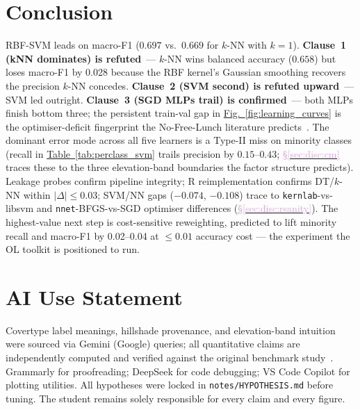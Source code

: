\documentclass[conference]{IEEEtran}
\newcommand{\figref}[1]{\hyperref[#1]{\textcolor{denim_comp}{Fig.~\ref*{#1}}}}
\newcommand{\tabref}[1]{\hyperref[#1]{\textcolor{sage}{Table~\ref*{#1}}}}
\newcommand{\secref}[1]{\hyperref[#1]{\textcolor{plum}{\S\ref*{#1}}}}
\begin{document}
\section{Conclusion}\label{sec:conclusion}
RBF-SVM leads on macro-F1 ($0.697$ vs.\ $0.669$ for $k$-NN with $k{=}1$).
\textbf{Clause~1 (kNN dominates) is refuted}~--- $k$-NN wins balanced
accuracy ($0.658$) but loses macro-F1 by 0.028 because the RBF kernel's
Gaussian smoothing recovers the precision $k$-NN concedes.
\textbf{Clause~2 (SVM second) is refuted upward}~--- SVM led outright.
\textbf{Clause~3 (SGD MLPs trail) is confirmed}~--- both MLPs finish bottom
three; the persistent train-val gap in \figref{fig:learning_curves}
is the optimiser-deficit fingerprint the No-Free-Lunch literature
predicts~\cite{wolpert1996nfl}.
The dominant error mode across all five learners is a Type-II miss on
minority classes (recall in \tabref{tab:perclass_svm} trails precision by
$0.15$--$0.43$; \secref{sec:disc:cm} traces these to the three elevation-band
boundaries the factor structure predicts).
Leakage probes confirm pipeline integrity; R reimplementation confirms
DT/$k$-NN within $|\Delta|{\leq}0.03$; SVM/NN gaps ($-0.074$, $-0.108$)
trace to \texttt{kernlab}-vs-libsvm and \texttt{nnet}-BFGS-vs-SGD
optimiser differences (\secref{sec:disc:rsanity}).
The highest-value next step is cost-sensitive reweighting, predicted to
lift minority recall and macro-F1 by 0.02--0.04 at $\leq 0.01$ accuracy
cost --- the experiment the OL toolkit is positioned to run.

\vspace{-4pt}\section*{AI Use Statement}
Covertype label meanings, hillshade provenance, and elevation-band intuition
were sourced via Gemini (Google) queries; all quantitative claims are
independently computed and verified against the original benchmark
study~\cite{blackard1999}. Grammarly for proofreading; DeepSeek for code
debugging; VS Code Copilot for plotting utilities. All hypotheses were locked
in \texttt{notes/HYPOTHESIS.md} before tuning. The student remains solely
responsible for every claim and every figure.
\end{document}
